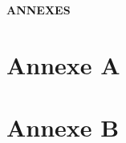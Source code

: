 
\begin{appendices}
\clearpage
\let\clearpage\relax
\vspace*{\fill}
\begin{center}
  \Huge\bfseries ANNEXES
\end{center}

\vspace*{\fill}
\chapter{Annexe A}
\label{appendix:annexeA}


\chapter{Annexe B}
\label{appendix:annexeB}




\end{appendices}